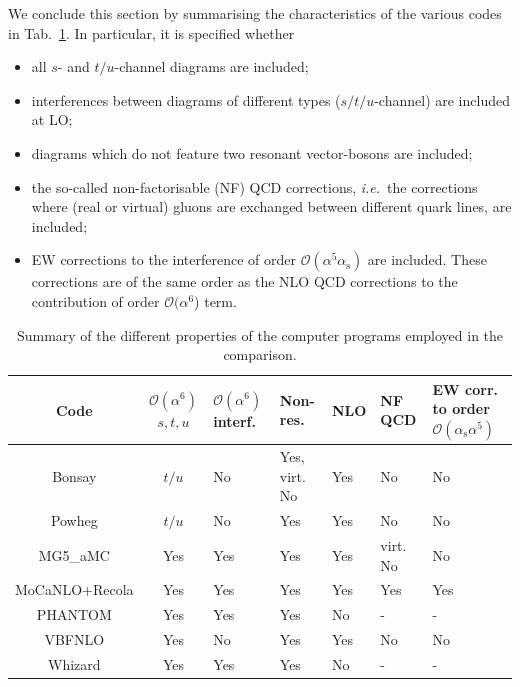 \documentclass[twocolumn,epjc3]{svjour3} %
\newcommand{\alphas}{\ensuremath{\alpha_\text{s}}\xspace}
\newlength{\width}
\begin{document}
    We conclude this section by summarising the characteristics of the various codes in Tab.~\ref{tab:wg1_codes}.
    In particular, it is specified whether
     \begin{itemize} 
        \item all $s$- and $t/u$-channel diagrams are included;
        \item interferences between diagrams of different types ($s/t/u$-channel) are included at LO;
        \item diagrams which do not feature two resonant vector-bosons are included;
        \item the so-called non-factoris\-able (NF) QCD corrections, \emph{i.e.}\ the corrections where (real or virtual) gluons are exchanged between different quark lines,
            are included;
        \item EW corrections to the interference of order $\mathcal O (\alpha^5\alphas)$ are included.
        These corrections are of the same order as the NLO QCD corrections to the contribution of order $\mathcal O (\alpha^6$) term.
     \end{itemize} 

    \begin{table}[ht!]
        \footnotesize
        \begin{tabularx}{\textwidth}{c|c|X|X|X|X|X}
            Code  &  $\mathcal O(\alpha^6)$ $s, t, u$  &  $\mathcal O(\alpha^6)$ interf.  &  Non-res.  & NLO &  NF QCD  &  EW corr. to order $\mathcal O(\alphas \alpha^5)$  \\
            \hline
            \hline
            {\sc Bonsay}        &  $t/u$    &  No       &  Yes, virt. No    &  Yes   & No       &  No  \\
            {\sc Powheg}        &  $t/u$    &  No       &  Yes              &  Yes   & No       &  No  \\
            {\sc MG5\_aMC}      &  Yes      &  Yes      &  Yes              &  Yes   & virt. No &  No \\
            {\sc MoCaNLO+Recola}&  Yes      &  Yes      &  Yes              &  Yes   & Yes      &  Yes  \\
            {\sc PHANTOM}       &  Yes      &  Yes      &  Yes              &  No    & -        & - \\
            {\sc VBFNLO}        &  Yes      &  No       &  Yes              &  Yes   & No       &  No  \\
            {\sc Whizard}       &  Yes      &  Yes      &  Yes              &  No    & -        & - \\
        \end{tabularx}
        \caption{\label{tab:wg1_codes} Summary of the different properties of the computer programs employed in the comparison.}
    \end{table}
\end{document}
